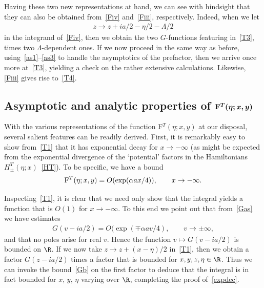 \documentclass[pdftex]{sigma}
\numberwithin{equation}{section}
\begin{document}
Having these two new representations at hand, we can see with hindsight that they can also be obtained from~\eqref{Fiv} and~\eqref{Fiii}, respectively. Indeed, when we let
\begin{gather}
z\to z+ia/2-\eta/2-\Lambda/2
\end{gather}
in the integrand of~\eqref{Fiv}, then we obtain the two $G$-functions featuring in~\eqref{T3}, times two $\Lambda$-dependent ones. If we now proceed in the same way as before, using~\eqref{as1}--\eqref{as3} to handle the asymptotics of the prefactor, then we arrive once more at~\eqref{T3}, yielding a check on the rather extensive calculations. Likewise, \eqref{Fiii} gives rise to~\eqref{T4}.

\subsection[Asymptotic and analytic properties of F$^T(\eta;x,y)$]{Asymptotic and analytic properties of $\boldsymbol{{\rm F}^T(\eta;x,y)}$}\label{section5.2}

With the various representations of the function F$^T(\eta;x,y)$ at our disposal, several salient features can be readily derived. First,  it is remarkably easy to show from~\eqref{T1} that it has exponential decay for $x\to -\infty$ (as might be expected from the exponential divergence of the `potential' factors in the Hamiltonians~$H^T_{\pm}(\eta;x)$~\eqref{HT}). To be specif\/ic, we have a bound
\begin{gather}\label{expdec}
{\rm F}^T(\eta;x,y)=O(\exp(\alpha ax/4)),\qquad x\to -\infty.
\end{gather}

Inspecting~\eqref{T1}, it is clear that we need only show that the integral  yields a function that is $O(1)$ for $x\to -\infty$. To this end we point out that from~\eqref{Gas} we have estimates
\begin{gather}\label{Gb}
G(v-ia/2)=O(\exp(\mp \alpha av/4),\qquad v\to \pm\infty,
\end{gather}
and that no poles arise for real $v$. Hence the function $v\mapsto G(v-ia/2)$ is bounded on $\R$. If we now take $z\to z+(x-\eta)/2$ in~\eqref{T1}, then we obtain a factor $G(z-ia/2)$ times a factor that is bounded for $x,y,z,\eta\in\R$. Thus we can invoke the bound~\eqref{Gb} on the f\/irst factor to deduce that the integral is in fact bounded for $x$, $y$, $\eta$ varying over $\R$, completing the proof of~\eqref{expdec}.
\end{document}
